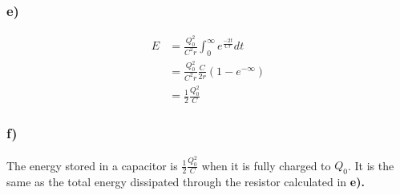 \documentclass[../homework.tex]{subfiles}
\begin{document}
\subsubsection*{e)}
\begin{align*}
    E &= \frac{Q_0^2}{C^2 r} \int_{0}^{\infty} e^{\frac{-2t}{Cr}} dt \\
    &= \frac{Q_0^2}{C^2 r} \frac{C}{2r} \left(1 - e^{-\infty} \right) \\
    &= \frac{1}{2} \frac{Q_0^2}{C}
\end{align*}

\subsubsection*{f)}
\indent \indent
The energy stored in a capacitor is $\frac{1}{2}\frac{Q_0^2}{C}$ when it is fully charged to $Q_0$. It is the same as the total energy dissipated through the resistor calculated in \bf{e)}.
\end{document}

